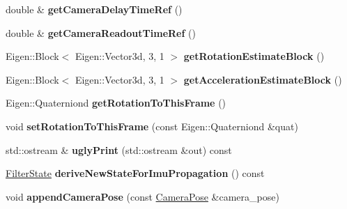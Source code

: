 \begin{DoxyCompactItemize}
\item 
\hypertarget{class_filter_state_a6563a73bad1016317018c85d53380962}{double \& {\bfseries get\-Camera\-Delay\-Time\-Ref} ()}\label{class_filter_state_a6563a73bad1016317018c85d53380962}

\item 
\hypertarget{class_filter_state_ab9d3e7cad1ae09ed35bcc528c0e8ef45}{double \& {\bfseries get\-Camera\-Readout\-Time\-Ref} ()}\label{class_filter_state_ab9d3e7cad1ae09ed35bcc528c0e8ef45}

\item 
\hypertarget{class_filter_state_a928bd10a77b39859d6f108f8dd8ae0e9}{Eigen\-::\-Block$<$ Eigen\-::\-Vector3d, 3, 1 $>$ {\bfseries get\-Rotation\-Estimate\-Block} ()}\label{class_filter_state_a928bd10a77b39859d6f108f8dd8ae0e9}

\item 
\hypertarget{class_filter_state_a4436166f7dbaf6c002b6fc2832b4f136}{Eigen\-::\-Block$<$ Eigen\-::\-Vector3d, 3, 1 $>$ {\bfseries get\-Acceleration\-Estimate\-Block} ()}\label{class_filter_state_a4436166f7dbaf6c002b6fc2832b4f136}

\item 
\hypertarget{class_filter_state_ab3d02580cdbd89bc64276467d7c1c854}{Eigen\-::\-Quaterniond {\bfseries get\-Rotation\-To\-This\-Frame} ()}\label{class_filter_state_ab3d02580cdbd89bc64276467d7c1c854}

\item 
\hypertarget{class_filter_state_ae820e97a5a74c7765780bc7bb223796b}{void {\bfseries set\-Rotation\-To\-This\-Frame} (const Eigen\-::\-Quaterniond \&quat)}\label{class_filter_state_ae820e97a5a74c7765780bc7bb223796b}

\item 
\hypertarget{class_filter_state_aed4aab3a5133d37924bc5c1284b6cb66}{std\-::ostream \& {\bfseries ugly\-Print} (std\-::ostream \&out) const }\label{class_filter_state_aed4aab3a5133d37924bc5c1284b6cb66}

\item 
\hypertarget{class_filter_state_af33cfbc67284846e3ca9c26a79c227a9}{\hyperlink{class_filter_state}{Filter\-State} {\bfseries derive\-New\-State\-For\-Imu\-Propagation} () const }\label{class_filter_state_af33cfbc67284846e3ca9c26a79c227a9}

\item 
\hypertarget{class_filter_state_a9fdc71df11cf72369b86be2eaffcea27}{void {\bfseries append\-Camera\-Pose} (const \hyperlink{class_camera_pose}{Camera\-Pose} \&camera\-\_\-pose)}\label{class_filter_state_a9fdc71df11cf72369b86be2eaffcea27}

\end{DoxyCompactItemize}


